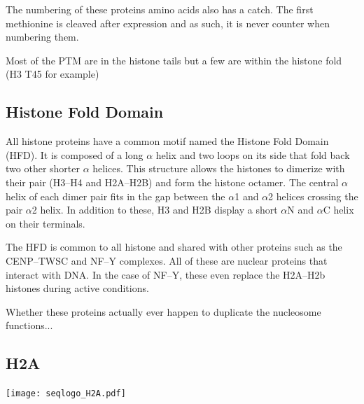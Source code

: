 \documentclass[10pt,a4paper,twocolumn,article]{memoir}
\begin{document}
    The numbering of these proteins amino acids also has a catch. The first methionine
    is cleaved after expression and as such, it is never counter when numbering them.

    Most of the PTM are in the histone tails but a few are within the histone fold (H3 T45 for example)

    \subsection{Histone Fold Domain}

      All histone proteins have a common motif named the Histone Fold Domain (HFD).
      It is composed of a long $\alpha$ helix and two loops on its side that fold
      back two other shorter $\alpha$ helices. This structure allows the histones
      to dimerize with their pair (H3--H4 and H2A--H2B) and form the histone
      octamer. The central $\alpha$ helix of each dimer pair fits in the gap between
      the $\alpha$1 and $\alpha$2 helices crossing the pair $\alpha$2 helix. In
      addition to these, H3 and H2B display a short $\alpha$N and $\alpha$C helix
      on their terminals.

      The HFD is common to all histone and shared with other
      proteins such as the CENP--TWSC and NF--Y complexes. All of these are nuclear
      proteins that interact with DNA. In the case of NF--Y, these even replace
      the H2A--H2b histones during active conditions.

      Whether these proteins actually ever happen to duplicate the nucleosome functions...


    \subsection{H2A}
      \begin{TableAndFigure*}
        \label{tab:H2A-consensus}
        

        \texttt{[image: seqlogo\_H2A.pdf]}
        \label{fig:H2A-weblogo}
      \end{TableAndFigure*}

\end{document}
